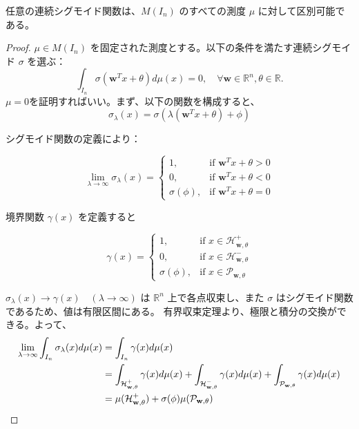 \documentclass[a4paper]{jsarticle}%
\begin{document}
\begin{prop}
任意の連続シグモイド関数は、$M(I_n)$ のすべての測度 $\mu$ に対して区別可能である。


\begin{proof}
$\mu \in M(I_n)$ を固定された測度とする。以下の条件を満たす連続シグモイド $\sigma$ を選ぶ：
\begin{equation}
  \int_{I_n} \sigma(\mathbf{w}^T x + \theta)d\mu(x) = 0, \quad \forall \mathbf{w} \in \mathbb{R}^n, \theta \in \mathbb{R}.\label{eq2}
\end{equation}
$\mu=0$を証明すればいい。まず、以下の関数を構成すると、
\[
\sigma_\lambda(x) = \sigma(\lambda(\mathbf{w}^T x + \theta) + \phi)
\]

シグモイド関数の定義により：

\[
\lim_{\lambda \to \infty} \sigma_\lambda(x) = \begin{cases} 
1, & \text{if } \mathbf{w}^T x + \theta > 0 \\
0, & \text{if } \mathbf{w}^T x + \theta < 0 \\
\sigma(\phi), & \text{if } \mathbf{w}^T x + \theta = 0
\end{cases}
\]

境界関数 $\gamma(x)$ を定義すると

\[
\gamma(x) = \begin{cases} 
1, & \text{if } x \in \mathcal{H}^+_{\mathbf{w},\theta} \\
0, & \text{if } x \in \mathcal{H}^-_{\mathbf{w},\theta} \\
\sigma(\phi), & \text{if } x \in \mathcal{P}_{\mathbf{w},\theta}
\end{cases}
\]

$\sigma_\lambda(x) \to \gamma(x)\quad (\lambda\to\infty)$ は $\mathbb{R}^n$ 上で各点収束し、また $\sigma$ はシグモイド関数であるため、値は有限区間にある。
有界収束定理\cite{lang1993real}より、極限と積分の交換ができる。よって、
\begin{align}
  \lim_{\lambda \to \infty} \int_{I_n} \sigma_\lambda(x) d\mu(x) &= \int_{I_n} \gamma(x) d\mu(x)\notag\\
  &= \int_{\mathcal{H}^+_{\mathbf{w},\theta}} \gamma(x) d\mu(x) + \int_{\mathcal{H}^-_{\mathbf{w},\theta}} \gamma(x) d\mu(x) + \int_{\mathcal{P}_{\mathbf{w},\theta}} \gamma(x) d\mu(x) \notag\\
  &= \mu(\mathcal{H}^+_{\mathbf{w},\theta}) + \sigma(\phi) \mu(\mathcal{P}_{\mathbf{w},\theta})\notag
\end{align}







\end{proof}
\end{prop}
\end{document}
